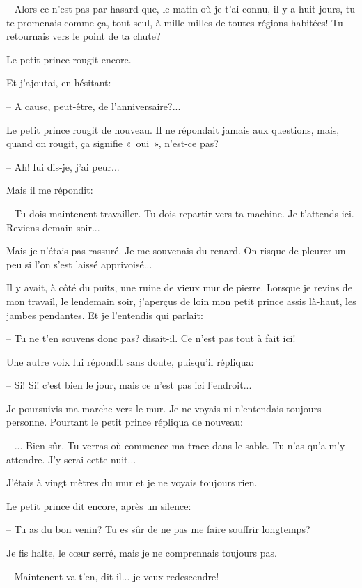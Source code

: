 \documentclass[a4paper]{report}
\begin{document}
-- Alors ce n'est pas par hasard que, le matin où je t'ai connu, il y a huit jours, tu te promenais comme ça, tout seul, à mille milles de toutes régions habitées! Tu retournais vers le point de ta chute?

Le petit prince rougit encore.

Et j'ajoutai, en hésitant:

-- A cause, peut-être, de l'anniversaire?...

Le petit prince rougit de nouveau. Il ne répondait jamais aux questions, mais, quand on rougit, ça signifie «~oui~», n'est-ce pas?

-- Ah! lui dis-je, j'ai peur...

Mais il me répondit:

-- Tu dois maintenent travailler. Tu dois repartir vers ta machine. Je t'attends ici. Reviens demain soir...

Mais je n'étais pas rassuré. Je me souvenais du renard. On risque de pleurer un peu si l'on s'est laissé apprivoisé...

\parachapter[XXVI]{} %
Il y avait, à côté du puits, une ruine de vieux mur de pierre. Lorsque je revins de mon travail, le lendemain soir, j'aperçus de loin mon petit prince assis là-haut, les jambes pendantes. Et je l'entendis qui parlait:

-- Tu ne t'en souvens donc pas? disait-il. Ce n'est pas tout à fait ici!

Une autre voix lui répondit sans doute, puisqu'il répliqua:

-- Si! Si! c'est bien le jour, mais ce n'est pas ici l'endroit...

Je poursuivis ma marche vers le mur. Je ne voyais ni n'entendais toujours personne. Pourtant le petit prince répliqua de nouveau:

-- ... Bien sûr. Tu verras où commence ma trace dans le sable. Tu n'as qu'a m'y attendre. J'y serai cette nuit...

J'étais à vingt mètres du mur et je ne voyais toujours rien.

Le petit prince dit encore, après un silence:

-- Tu as du bon venin? Tu es sûr de ne pas me faire souffrir longtemps?

Je fis halte, le cœur serré, mais je ne comprennais toujours pas.

-- Maintenent va-t'en, dit-il... je veux redescendre! 
\end{document}
